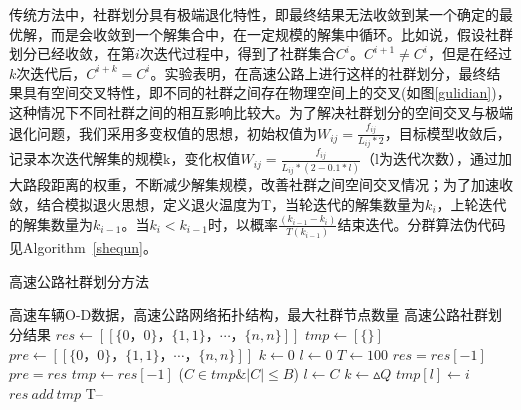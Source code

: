 				传统方法中，社群划分具有极端退化特性，即最终结果无法收敛到某一个确定的最优解，而是会收敛到一个解集合中，在一定规模的解集中循环。比如说，假设社群划分已经收敛，在第$i$次迭代过程中，得到了社群集合$C^i$。$C^{i+1}\ne C^{i}$，但是在经过$k$次迭代后，$C^{i+k}=C^{i}$。实验表明，在高速公路上进行这样的社群划分，最终结果具有空间交叉特性，即不同的社群之间存在物理空间上的交叉(如图\ref{gulidian})，这种情况下不同社群之间的相互影响比较大。为了解决社群划分的空间交叉与极端退化问题，我们采用多变权值的思想，初始权值为$W_{ij}=\frac{f_{ij}}{L_{ij}*2}$，目标模型收敛后，记录本次迭代解集的规模k，变化权值$W_{ij}=\frac{f_{ij}}{L_{ij}*(2-0.1*l)}$（l为迭代次数），通过加大路段距离的权重，不断减少解集规模，改善社群之间空间交叉情况；为了加速收敛，结合模拟退火思想，定义退火温度为T，当轮迭代的解集数量为$k_i$，上轮迭代的解集数量为$k_{i-1}$。当$k_i<k_{i-1}$时，以概率$\frac {(k_{i-1}-k_i)}{T(k_{i-1})}$结束迭代。分群算法伪代码见Algorithm\ \ref{shequn}。

				\begin{algorithm}[h]
		        \caption{高速公路社群划分方法}  
		        \label{shequn}
		        \begin{algorithmic}[1] %
		            \Require 高速车辆O-D数据，高速公路网络拓扑结构，最大社群节点数量
		            \Ensure 高速公路社群划分结果
		                \State $res\gets [[\{0，0\}，\{1,1\}，\cdots，\{n,n\}]]$ 
		                \State $tmp\gets [\{\}]$
		                \State $pre\gets [[\{0，0\}，\{1,1\}，\cdots，\{n,n\}]]$ 
		                \State $k\gets 0$  
		                \State $l\gets 0$
		                \State $T\gets 100$  
		                	\State $res=res[-1]$
		                	\State $pre=res$
			                	\State $tmp\gets res[-1]$  
			                		\For($C \in tmp \& |C| \le B$)
				                        	\State $l\gets C$  
				                        	\State $k\gets {\vartriangle Q}$  
			                    		\EndIf	
			                		\EndFor
			                    	\State $tmp[l] \gets i$ 
			                	\EndFor
			                	\State $res \ add \ tmp$
		                	\EndWhile
		                	\State T--
		                \EndWhile  
		                \State {}  
		            \EndFunction  
		        \end{algorithmic}  
		    	\end{algorithm} 

